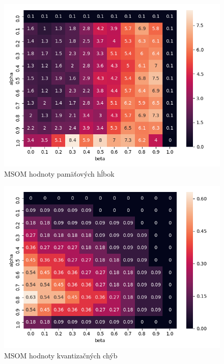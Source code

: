     \begin{figure}[H]
        \centering
        \includegraphics[width=\textwidth]{assets/m_memory_span}
        \caption{MSOM hodnoty pamäťových hĺbok}
        \label{msom_memory_span}
    \end{figure}
    
    \begin{figure}[H]
        \centering
        \includegraphics[width=\textwidth]{assets/m_errors}
        \caption{MSOM hodnoty kvantizačných chýb}
        \label{msom_errors}
    \end{figure}

